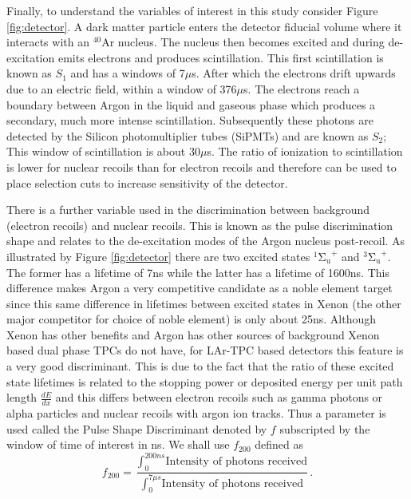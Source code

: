 \documentclass[11pt]{article} %
\begin{document}
\par Finally, to understand the variables of interest in this study consider Figure \ref{fig:detector}.
A dark matter particle enters the detector fiducial volume where it interacts with an $^{40}\mathrm{\text{Ar}}$ nucleus.
The nucleus then becomes excited and during de-excitation emits electrons and produces scintillation.
This first scintillation is known as $S_1$ and has a windows of 7$\mu$s.
After which the electrons drift upwards due to an electric field, within a window of 376$\mu$s.
The electrons reach a boundary between Argon in the liquid and gaseous phase which produces a secondary, much more intense scintillation.
Subsequently these photons are detected by the Silicon photomultiplier tubes (SiPMTs) and are known as $S_2$; This window of scintillation is about 30$\mu$s.
The ratio of ionization to scintillation is lower for nuclear recoils than for electron recoils and therefore can be used to place selection cuts to increase sensitivity of the detector.
\\
\par There is a further variable used in the discrimination between background (electron recoils) and nuclear recoils.
This is known as the pulse discrimination shape and relates to the de-excitation modes of the Argon nucleus post-recoil.
As illustrated by Figure \ref{fig:detector} there are two excited states $^{1}\mathrm{{\Sigma_{u}}^{+}}$ and $^{3}\mathrm{{\Sigma_{u}}^{+}}$.
The former has a lifetime of 7ns while the latter has a lifetime of 1600ns.
This difference makes Argon a very competitive candidate as a noble element target since this same difference in lifetimes between
excited states in Xenon (the other major competitor for choice of noble element) is only about 25ns.
Although Xenon has other benefits and Argon has other sources of background Xenon based dual phase TPCs do not have, for LAr-TPC based
detectors this feature is a very good discriminant.
This is due to the fact that the ratio of these excited state lifetimes is related to the stopping power or deposited energy per unit path length
$\frac{dE}{dx}$ and this differs between electron recoils such as gamma photons or alpha particles and
nuclear recoils with argon ion tracks.
Thus a parameter is used called the Pulse Shape Discriminant denoted by $f$ subscripted by the window of time of interest in ns.
We shall use $f_{200}$ defined as
\begin{equation}
f_{200}=\frac{\int_{0}^{200ns}\text{Intensity of photons received}}{\int_{0}^{7\mu s}\text{Intensity of photons received}}.
\end{equation}
\end{document}
